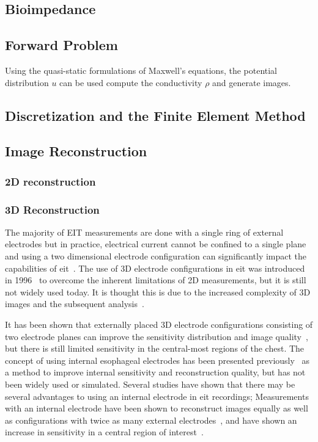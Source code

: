 \subsection{Bioimpedance}



\subsection{Forward Problem}
Using the quasi-static 
formulations of Maxwell's equations, the potential distribution $u$ can be used 
compute the conductivity $\rho$ and generate images.

\subsection{Discretization and the Finite Element Method}

\subsection{Image Reconstruction}

\subsubsection{2D reconstruction}

\subsubsection{3D Reconstruction}
The majority of EIT measurements are done with a single ring of external electrodes but 
in practice, electrical current cannot  be confined to a single plane
and using a two dimensional electrode configuration can significantly
impact the capabilities of \acrshort{eit}~\parencite{Rabbani1991}.
The use of 3D electrode configurations in \acrshort{eit}
was introduced in 1996~\parencite{Metherall1996} to overcome the 
inherent limitations of 2D measurements, but it is still not widely used today.
It is thought this is due to the increased complexity of 3D images
and the subsequent analysis~\parencite{Grychtol2019}.

It has been shown that externally placed 3D electrode configurations
consisting of two electrode planes
can improve the sensitivity distribution and image quality~\parencite{Grychtol2016},
but there is still limited sensitivity in the central-most regions 
of the chest.
The concept of using internal esophageal electrodes has been presented
previously~\parencite{Pilkington1989,Schuessler1995}
as a method to improve internal sensitivity 
and reconstruction quality,
but has not been widely used or simulated.
Several studies have shown that there may be several advantages to using an internal
electrode in \acrshort{eit} recordings; 
Measurements with an internal electrode have been 
shown to reconstruct images equally as well as configurations with 
twice as many external electrodes~\parencite{Schuessler1995},
and have shown an increase in sensitivity in a central region 
of interest~\parencite{Kwon2013,Czaplik2014,Farooq2014}.
